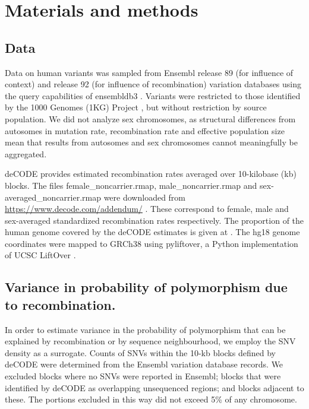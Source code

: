 \section{Materials and methods} \label{methods}

\subsection*{Data}

Data on human variants was sampled from Ensembl release 89 (for influence of context) and release 92 (for influence of recombination) variation databases \citep{Cunningham2015} using the query capabilities of ensembldb3 \citep{hutt_ensdb3}. Variants were restricted to those identified by the 1000 Genomes (1KG) Project \citep{Auton2015}, but without restriction by source population. We did not analyze sex chromosomes, as structural differences from autosomes in mutation rate, recombination rate and effective population size mean that results from autosomes and sex chromosomes cannot meaningfully be aggregated.

deCODE provides estimated recombination rates averaged over 10-kilobase (kb) blocks. The files female\_noncarrier.rmap, male\_noncarrier.rmap and sex-averaged\_noncarrier.rmap were downloaded from  \url{https://www.decode.com/addendum/} \citep{Kong_2010}. These correspond to female, male and sex-averaged standardized recombination rates respectively. The proportion of the human genome covered by the deCODE estimates is given at \citet[][Supplementary Table 2]{Kong_2010}. The hg18 genome coordinates were mapped to GRCh38 using pyliftover, a Python implementation of UCSC LiftOver \citep{tretyakov_pylift}.

\subsection*{Variance in probability of polymorphism due to recombination.}

In order to estimate variance in the probability of polymorphism that can be explained by recombination or by sequence neighbourhood, we employ the SNV density as a surrogate. Counts of SNVs within the 10-kb blocks defined by deCODE were determined from the Ensembl variation database records. We excluded blocks where no SNVs were reported in Ensembl; blocks that were identified by deCODE as overlapping unsequenced regions; and blocks adjacent to these. The  portions excluded in this way did not exceed 5\% of any chromosome.

